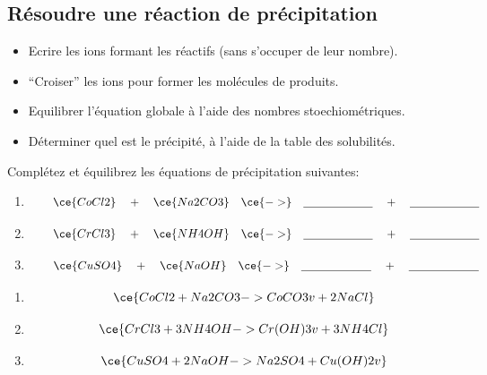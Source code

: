 \documentclass[
  11pt,
  a4paper,
  openany]{book}
\providecommand{\tightlist}{%
  \setlength{\itemsep}{0pt}\setlength{\parskip}{0pt}}
\begin{document}
\subsection{Résoudre une réaction de précipitation}\label{ruxe9soudre-une-ruxe9action-de-pruxe9cipitation}

\begin{itemize}
\tightlist
\item
  Ecrire les ions formant les réactifs (sans s'occuper de leur nombre).
\item
  ``Croiser'' les ions pour former les molécules de produits.
\item
  Equilibrer l'équation globale à l'aide des nombres stoechiométriques.
\item
  Déterminer quel est le précipité, à l'aide de la table des solubilités.
\end{itemize}

\begin{Exercise}

Complétez et équilibrez les équations de précipitation suivantes:

\begin{enumerate}
\def\labelenumi{\arabic{enumi}.}
\item
  \[\qquad \ce{CoCl2} \quad + \quad \ce{Na2CO3} \quad \ce{->} \quad \underline{\hspace{6em}} \quad + \quad \underline{\hspace{6em}}\]
\item
  \[\qquad \ce{CrCl3} \quad + \quad \ce{NH4OH} \quad \ce{->} \quad \underline{\hspace{6em}} \quad + \quad \underline{\hspace{6em}}\]
\item
  \[\qquad \ce{CuSO4} \quad + \quad \ce{NaOH} \quad \ce{->} \quad \underline{\hspace{6em}} \quad + \quad \underline{\hspace{6em}}\]
\end{enumerate}

\end{Exercise}

\begin{Answer}

\begin{enumerate}
\def\labelenumi{\arabic{enumi}.}
\item
  \[\ce{CoCl2 + Na2CO3 -> CoCO3 v + 2 NaCl}\]
\item
  \[\ce{CrCl3 + 3NH4OH -> Cr(OH)3 v + 3 NH4Cl}\]
\item
  \[\ce{CuSO4 + 2 NaOH -> Na2SO4 + Cu(OH)2 v}\]
\end{enumerate}

\end{Answer}
\end{document}
